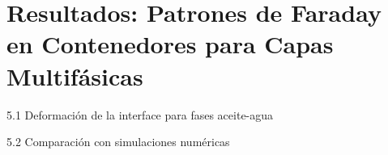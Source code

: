 \chapter{Resultados: Patrones de Faraday en Contenedores para Capas Multifásicas}

5.1 Deformación de la interface para fases aceite-agua

5.2 Comparación con simulaciones numéricas
